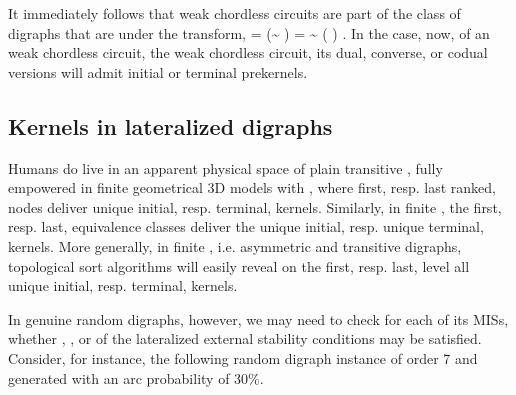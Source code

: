 \documentclass[a4paper,12pt,english]{sphinxhowto}
\begin{document}
It immediately follows that weak chordless circuits are part of the class of digraphs that are  under the  transform,  = \sphinxhyphen{} (\textasciitilde{}  ) = \textasciitilde{} ( \sphinxhyphen{} ) \sphinxfootnotemark[13]. In the case, now, of an  weak chordless circuit,  the weak chordless circuit,  its dual, converse, or codual versions will admit  initial or terminal prekernels.


\subsection{Kernels in lateralized digraphs}
\label{\detokenize{tutorial:kernels-in-lateralized-digraphs}}
Humans do live in an apparent physical space of plain transitive , fully empowered in finite geometrical 3D models with , where first, resp. last ranked, nodes deliver unique initial, resp. terminal, kernels. Similarly, in finite , the first, resp. last, equivalence classes deliver the unique initial, resp. unique terminal, kernels. More generally, in finite , i.e. asymmetric and transitive digraphs, topological sort algorithms will easily reveal on the first, resp. last, level all unique initial, resp. terminal, kernels.

In genuine random digraphs, however, we may need to check for each of its MISs, whether , , or  of the lateralized external stability conditions may be satisfied. Consider, for instance, the following random digraph instance of order 7 and generated with an arc probability of 30\%.

\begin{sphinxVerbatim}[commandchars=\\\{\},numbers=left,firstnumber=1,stepnumber=1]
   
  
\end{sphinxVerbatim}
\end{document}
